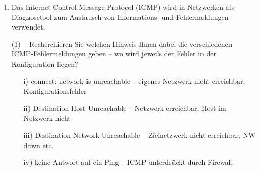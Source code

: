 \documentclass[paper=a4,fontsize=11pt]{scrartcl}%
\numberwithin{equation}{section}
\begin{document}
\begin{center}
\begin{enumerate}
\begin{tasks}
\begin{itemize}
\begin{itemize}
			\item Ref: Anzahl der Referenzen  
			\item Use Iface: Interface oder NIC
		\end{itemize}
		\item \url{https://www.cyberciti.biz/faq/what-is-a-routing-table/}
	\end{itemize}
	\task~ Welchen Kernel-Parameter müssen Sie aktivieren (bzw. welche Datei im  Verzeichnis müssen sie editieren), sodass das IP-Forwarding aktiviert wird? Welche Möglichkeiten zum Editieren dieser Datei haben Sie?
	\begin{itemize}
		\item als \emph{root}-Nutzer bzw. via \emph{sudo} \emph{sysctl net.ipv4.ip\_forward}
		\item Ausschalten: \emph{sysctl -w net.ipv4.ip\_forward=0}
	\end{itemize}
	\task~ In welcher Konfigurationsdatei müssen Sie einen Eintrag vornehmen, so das das Routing dauerhaft beim Systemstart aktiviert bleibt? Notieren Sie sich beispielhaft (auszugsweise) wie dies aussehen kann.
	\begin{itemize}
		\item {}
	\end{itemize}
	\end{tasks}
	\begin{lstlisting}[style=Bash, language=Bash, label={netcat_server}]
...
# Uncomment the next line to enable packet forwarding for IPv4
net.ipv4.ip_forward = 1
...
		\end{lstlisting}
	\item Das Internet Control Message Protocol (ICMP) wird in Netzwerken als Diagnosetool zum Austausch von Informations- und Fehlermeldungen verwendet. 
	\begin{tasks}(1)
		\task~ Recherchieren Sie welchen Hinweis Ihnen dabei die verschiedenen ICMP-Fehlermeldungen geben -- wo wird jeweils der Fehler in der Konfiguration liegen?
		\begin{itemize}
			\item[i)] connect: network is unreachable -- eigenes Netzwerk nicht erreichbar, Konfigurationsfehler
			\item[ii)] Destination Host Unreachable -- Netzwerk erreichbar, Host im Netzwerk nicht
			\item[iii)] Destination Network Unreachable -- Zielnetzwerk nicht erreichbar, NW down etc. 
			\item[iv)] keine Antwort auf ein Ping -- ICMP unterdrückt durch Firewall
		\end{itemize}  
	\end{tasks}
\end{enumerate}
\end{center}
\end{document}
